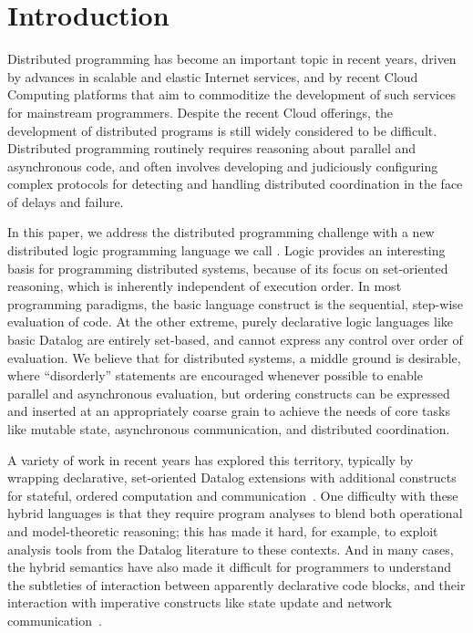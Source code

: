 \section{Introduction}
Distributed programming has become an important topic in recent years, driven by advances in scalable and elastic Internet services, and by recent Cloud Computing platforms that aim to commoditize the development of such services for mainstream programmers.  Despite the recent Cloud offerings, the development of distributed programs is still widely considered to be difficult.  Distributed programming routinely requires reasoning about parallel and asynchronous code, and often involves developing and judiciously configuring complex protocols for detecting and handling distributed coordination in the face of delays and failure.

In this paper, we address the distributed programming challenge with a new distributed logic programming language we call {\em \lang}.
Logic provides an interesting basis for programming distributed systems, because of its focus on set-oriented reasoning, which is inherently independent of execution order.  In most programming paradigms, the basic language construct is the sequential, step-wise evaluation of code. At the other extreme, purely declarative logic languages like basic Datalog are entirely set-based, and cannot express any control over order of evaluation.  We believe that for distributed systems, a middle ground is desirable, where ``disorderly'' statements are encouraged whenever possible to enable parallel and asynchronous evaluation, but ordering constructs can be expressed and inserted at an appropriately coarse grain to achieve the needs of core tasks like mutable state, asynchronous communication, and distributed coordination.

A variety of work in recent years has explored this territory, typically by wrapping declarative, set-oriented Datalog extensions with additional constructs for stateful, ordered computation and communication~\cite{boon,reactors,meld,prologevents}.  One difficulty with these hybrid languages is that they require program analyses to blend both operational and model-theoretic reasoning; this has made it hard, for example, to exploit analysis tools from the Datalog literature to these contexts.  And in many cases, the hybrid semantics have also made it difficult for programmers to understand the subtleties of interaction between apparently declarative code blocks, and their interaction with imperative constructs like state update and network communication~\cite{Mao2009,navarro}.

